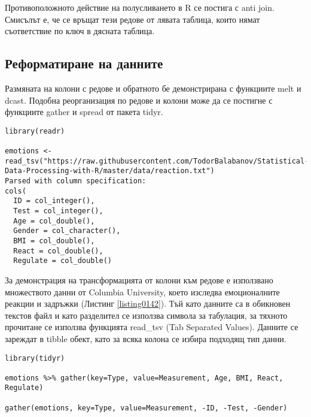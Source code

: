Противоположното действие на полусливането в R се постига с anti join. Смисълът е, че се връщат тези редове от лявата таблица, които нямат съответствие по ключ в дясната таблица. 

\subsection{Реформатиране на данните}

Размяната на колони с редове и обратното бе демонстрирана с функциите melt и dcast. Подобна реорганизация по редове и колони може да се постигне с функциите gather и spread от пакета tidyr. 

\begin{lstlisting}[caption=Данни за реакциите, label=listing0142]
library(readr)

emotions <- read_tsv("https://raw.githubusercontent.com/TodorBalabanov/Statistical-Data-Processing-with-R/master/data/reaction.txt")
Parsed with column specification:
cols(
  ID = col_integer(),
  Test = col_integer(),
  Age = col_double(),
  Gender = col_character(),
  BMI = col_double(),
  React = col_double(),
  Regulate = col_double()
\end{lstlisting}

За демонстрация на трансформацията от колони към редове е използвано множеството данни от Columbia University, което изследва емоционалните реакции и задръжки (Листинг \ref{listing0142}). Тъй като данните са в обикновен текстов файл и като разделител се използва символа за табулация, за тяхното прочитане се използва функцията read\_tsv (Tab Separated Values). Данните се зареждат в tibble обект, като за всяка колона се избира подходящ тип данни. 

\begin{lstlisting}[caption=Свиване от колони в редове, label=listing0143]
library(tidyr)

emotions %>% gather(key=Type, value=Measurement, Age, BMI, React, Regulate)

gather(emotions, key=Type, value=Measurement, -ID, -Test, -Gender)
\end{lstlisting}

